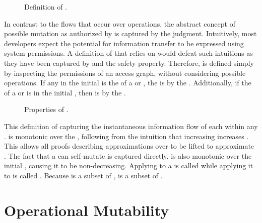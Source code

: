\begin{figure}
\COQDOCmutableSpec{}
\caption{Definition of \TMmutable{}. \label{def:flow:mutable}}
\end{figure}

In contrast to the flows that occur over operations, the abstract concept of possible mutation as authorized by \TMaccessRights{} is captured by the \COQmutable{} judgment.
Intuitively, most developers expect the potential for information transfer to be expressed using system permissions.
A definition of \COQmutable{} that relies on \COQmutated{} would defeat such intuitions as they have been captured by \TMpotAcc{} and the safety property.
Therefore, \COQmutable{} is defined simply by inspecting the permissions of an access graph, without considering possible operations.
If any \TMobj{} in the initial \TMsubsystem{} is the \TMedgeSource{} of a \NMwr{} or \NMtx{} \TMaccessEdge{}, the \TMedgeTarget{} is \TMmutable{} by the \TMsubsystem{}.
Additionally, if the \TMedgeTarget{} of a \NMrd{} or \NMwk{} \TMaccessEdge{} is in the initial \TMsubsystem{}, then \TMedgeSource{} is \TMmutable{} by the \TMsubsystem{}.

\begin{figure}
  \COQDOCmutableSpecSubset{}
  \COQDOCproperMutableSpec{}
  \caption{Properties of \TMmutable{}. \label{fig:flow:mutableProperties}}
\end{figure}

This definition of \TMmutable{} capturing the instantaneous information flow of each \TMaccessRight{} within any \TMaccessGraph{}.
\xmakefirstuc{\TMmutable{}} is monotonic over the \TMaccessGraph{}, following from the intuition that increasing \TMaccessRights{} increases \TMmutability{}.
This allows all proofs describing approximations over \TMaccessGraphs{} to be lifted to approximate \TMmutability{}.
The fact that a \TMsubsystem{} can self-mutate is captured directly.
\xmakefirstuc{\COQmutable{}} is also monotonic over the initial \TMsubsystem{}, causing it to be non-decreasing.
Applying \TMmutable{} to a \TMdirAccAG{} is called \TMdirAccMutability{} while applying it to \TMpotAccAG{} is called \TMpotAccMutability{}.
Because \TMdirAcc{} is a subset of \TMpotAcc{}, \TMdirAccMutability{} is a subset of \TMpotAccMutability{}.

\section{Operational Mutability}

